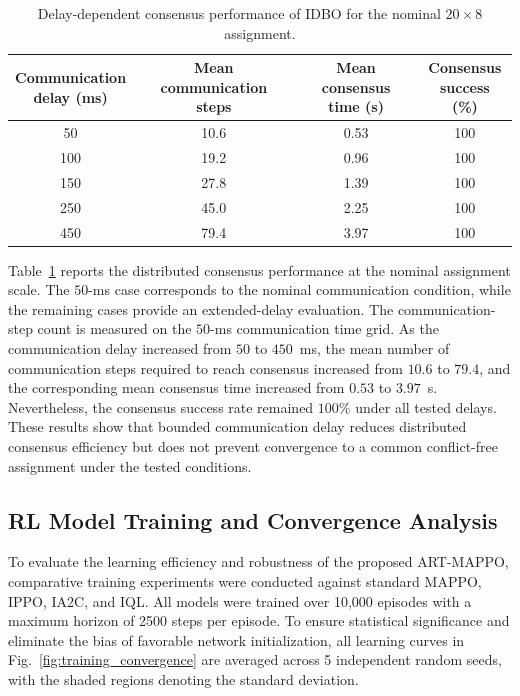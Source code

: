 \documentclass[lettersize,journal]{IEEEtran}
\begin{document}
\begin{table}[!t]
\centering
\footnotesize
\setlength{\tabcolsep}{2.8pt}
\renewcommand{\arraystretch}{1.12}
\caption{Delay-dependent consensus performance of IDBO for the
nominal $20\times8$ assignment.}
\label{tab:idbo_delay_scalability}
\begin{tabular}{@{}cccc@{}}
\hline\hline
\shortstack{Communication\\delay (ms)} &
\shortstack{Mean communication\\steps} &
\shortstack{Mean consensus\\time (s)} &
\shortstack{Consensus\\success (\%)} \\
\hline
50  & 10.6 & 0.53 & 100 \\
100 & 19.2 & 0.96 & 100 \\
150 & 27.8 & 1.39 & 100 \\
250 & 45.0 & 2.25 & 100 \\
450 & 79.4 & 3.97 & 100 \\
\hline
\end{tabular}
\end{table}

Table~\ref{tab:idbo_delay_scalability} reports the distributed
consensus performance at the nominal assignment scale. The $50$-ms case
corresponds to the nominal communication condition, while the remaining cases
provide an extended-delay evaluation. The communication-step count is measured
on the $50$-ms communication time grid. As the communication delay increased
from $50$ to $450$~ms, the mean number of communication steps required to
reach consensus increased from
$10.6$ to $79.4$, and the corresponding mean consensus time increased from
$0.53$ to $3.97$~s. Nevertheless, the consensus success rate remained
$100\%$ under all tested delays. These results show that bounded communication
delay reduces distributed consensus efficiency but does not prevent convergence
to a common conflict-free assignment under the tested conditions.








\subsection{RL Model Training and Convergence Analysis}
\label{subsec:training}

To evaluate the learning efficiency and robustness of the proposed ART-MAPPO, comparative training experiments were conducted against standard MAPPO, IPPO, IA2C, and IQL. All models were trained over 10,000 episodes with a maximum horizon of 2500 steps per episode. To ensure statistical significance and eliminate the bias of favorable network initialization, all learning curves in Fig.~\ref{fig:training_convergence} are averaged across 5 independent random seeds, with the shaded regions denoting the standard deviation.
\end{document}
